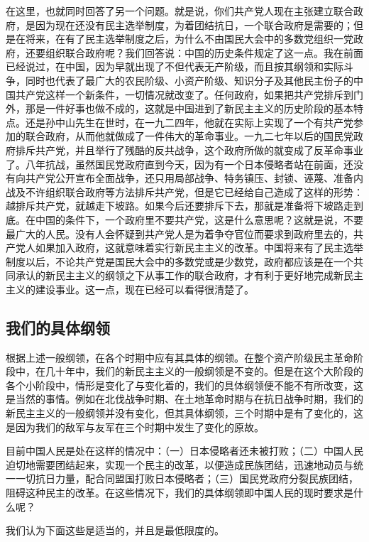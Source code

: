 在这里，也就同时回答了另一个问题。就是说，你们共产党人现在主张建立联合政府，是因为现在还没有民主选举制度，为着团结抗日，一个联合政府是需要的；但是在将来，在有了民主选举制度之后，为什么不由国民大会中的多数党组织一党政府，还要组织联合政府呢？我们回答说：中国的历史条件规定了这一点。我在前面已经说过，在中国，因为早就出现了不但代表无产阶级，而且按其纲领和实际斗争，同时也代表了最广大的农民阶级、小资产阶级、知识分子及其他民主份子的中国共产党这样一个新条件，一切情况就改变了。任何政府，如果把共产党排斥到门外，那是一件好事也做不成的，这就是中国进到了新民主主义的历史阶段的基本特点。还是孙中山先生在世时，在一九二四年，他就在实际上实现了一个有共产党参加的联合政府，从而他就做成了一件伟大的革命事业。一九二七年以后的国民党政府排斥共产党，并且举行了残酷的反共战争，这个政府所做的就变成了反革命事业了。八年抗战，虽然国民党政府直到今天，因为有一个日本侵略者站在前面，还没有向共产党公开宣布全面战争，还只用局部战争、特务镇压、封锁、诬蔑、准备内战及不许组织联合政府等方法排斥共产党，但是它已经给自己造成了这样的形势：越排斥共产党，就越走下坡路。如果今后还要排斥下去，那就是准备将下坡路走到底。在中国的条件下，一个政府里不要共产党，这是什么意思呢？这就是说，不要最广大的人民。没有人会怀疑到共产党人是为着争夺官位而要求到政府里去的，共产党人如果加入政府，这就意味着实行新民主主义的改革。中国将来有了民主选举制度以后，不论共产党是国民大会中的多数党或是少数党，政府都应该是在一个共同承认的新民主主义的纲领之下从事工作的联合政府，才有利于更好地完成新民主主义的建设事业。这一点，现在已经可以看得很清楚了。

\subsection{我们的具体纲领}

根据上述一般纲领，在各个时期中应有其具体的纲领。在整个资产阶级民主革命阶段中，在几十年中，我们的新民主主义的一般纲领是不变的。但是在这个大阶段的各个小阶段中，情形是变化了与变化着的，我们的具体纲领便不能不有所改变，这是当然的事情。例如在北伐战争时期、在土地革命时期与在抗日战争时期，我们的新民主主义的一般纲领并没有变化，但其具体纲领，三个时期中是有了变化的，这是因为我们的敌军与友军在三个时期中发生了变化的原故。

目前中国人民是处在这样的情况中：（一）日本侵略者还未被打败；（二）中国人民迫切地需要团结起来，实现一个民主的改革，以便造成民族团结，迅速地动员与统一一切抗日力量，配合同盟国打败日本侵略者；（三）国民党政府分裂民族团结，阻碍这种民主的改革。在这些情况下，我们的具体纲领即中国人民的现时要求是什么呢？

我们认为下面这些是适当的，并且是最低限度的。

